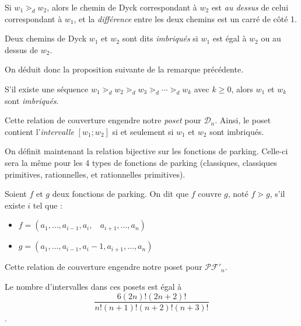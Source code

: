 \begin{rem}
    Si $w_1 \gtrdot_d w_2$, alors le chemin de Dyck correspondant à $w_2$
    est \emph{au dessus} de celui correspondant à $w_1$, et la
    \emph{différence} entre les deux chemins est un carré de côté 1.
\end{rem}

\begin{definition}
    Deux chemins de Dyck $w_1$ et $w_2$ sont dits \emph{imbriqués}
    si $w_1$ est égal à $w_2$ ou au dessus de $w_2$. 
\end{definition}

On déduit donc la proposition suivante de la remarque précédente.

\begin{prop}
    S'il existe une séquence $w_1 \gtrdot_d w_2 \gtrdot_d
    w_3 \gtrdot_d \cdots \gtrdot_d w_k$ avec $k \geqslant 0$,
    alors $w_1$ et $w_k$ sont \emph{imbriqués}.
\end{prop}

Cette relation de couverture engendre notre \emph{poset} pour
$\mathcal{D}_n$.
Ainsi, le poset contient l'\emph{intervalle} $[w_1;w_2]$ si et seulement
si $w_1$ et $w_2$ sont imbriqués.

On définit maintenant la relation bijective sur les fonctions de parking.
Celle-ci sera la même pour les 4 types de fonctions de parking (classiques,
classiques primitives, rationnelles, et rationnelles primitives).

\begin{definition}[$\gtrdot$]
    Soient $f$ et $g$ deux fonctions de parking.
    On dit que $f$ couvre $g$, noté $f \gtrdot g$, s'il existe $i$ tel que :
    \begin{itemize}
        \item $f = (a_1, \ldots, a_{i-1}, a_i,\ \ \ \ 
            a_{i+1}, \ldots, a_n)$
        \item $g = (a_1, \ldots, a_{i-1}, a_i - 1, a_{i+1},
        \ldots, a_n)$
    \end{itemize}
\end{definition}

Cette relation de couverture engendre notre poset pour $\mathcal{PF'}_n$.

\begin{theorem}
    Le nombre d'intervalles dans ces posets est égal à
    $$\frac {6 (2n)! (2n+2)!}{n!(n+1)!(n+2)!(n+3)!}$$.
\end{theorem}

